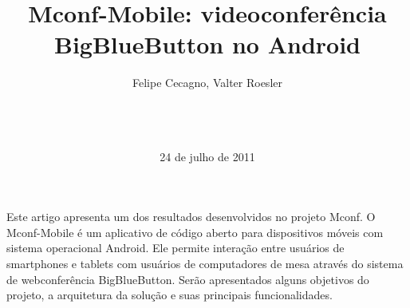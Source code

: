 \documentclass{acm_proc_article-sp}
\begin{document}
\title{Mconf-Mobile: videoconferência \\BigBlueButton no Android}
%
%
%
%
%

%
\author{
%
%
Felipe Cecagno,
Valter Roesler\\
       \\
       \\
       \\
}
\date{24 de julho de 2011}

\maketitle
\begin{resumo}
  Este artigo apresenta um dos resultados desenvolvidos no projeto Mconf. O Mconf-Mobile é um aplicativo de código aberto para dispositivos móveis com sistema operacional Android. Ele permite interação entre usuários de smartphones e tablets com usuários de computadores de mesa através do sistema de webconferência BigBlueButton. Serão apresentados alguns objetivos do projeto, a arquitetura da solução e suas principais funcionalidades.
\end{resumo}
\end{document}
